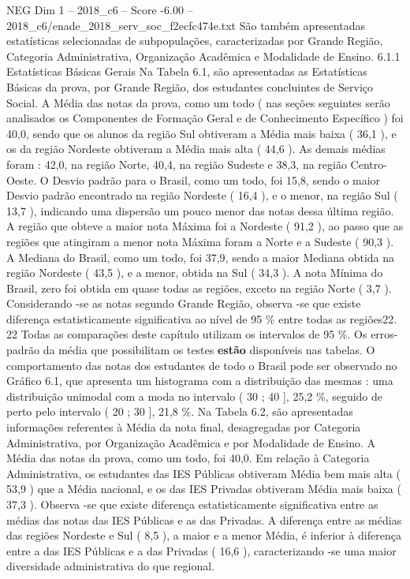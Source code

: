 \begin{textsample}{NEG Dim 1 – 2018\_c6 – Score -6.00 – 2018\_c6/enade\_2018\_serv\_soc\_f2ecfc474e.txt}
São também apresentadas estatísticas selecionadas de subpopulações, caracterizadas por Grande Região, Categoria Administrativa, Organização Acadêmica e Modalidade de Ensino. 6.1.1 Estatísticas Básicas Gerais Na Tabela 6.1, são apresentadas as Estatísticas Básicas da prova, por Grande Região, dos estudantes concluintes de Serviço Social.
A Média das notas da prova, como um todo ( nas seções seguintes serão analisados os Componentes de Formação Geral e de Conhecimento Específico ) foi 40,0, sendo que os alunos da região Sul obtiveram a Média mais baixa ( 36,1 ), e os da região Nordeste obtiveram a Média mais alta ( 44,6 ).
As demais médias foram : 42,0, na região Norte, 40,4, na região Sudeste e 38,3, na região Centro-Oeste.
O Desvio padrão para o Brasil, como um todo, foi 15,8, sendo o maior Desvio padrão encontrado na região Nordeste ( 16,4 ), e o menor, na região Sul ( 13,7 ), indicando uma dispersão um pouco menor das notas dessa última região.
A região que obteve a maior nota Máxima foi a Nordeste ( 91,2 ), ao passo que as regiões que atingiram a menor nota Máxima foram a Norte e a Sudeste ( 90,3 ).
A Mediana do Brasil, como um todo, foi 37,9, sendo a maior Mediana obtida na região Nordeste ( 43,5 ), e a menor, obtida na Sul ( 34,3 ).
A nota Mínima do Brasil, zero foi obtida em quase todas as regiões, exceto na região Norte ( 3,7 ).
Considerando -se as notas segundo Grande Região, observa -se que existe diferença estatisticamente significativa ao nível de 95 \% entre todas as regiões22. 22 Todas as comparações deste capítulo utilizam os intervalos de 95 \%.
Os erros-padrão da média que possibilitam os testes \textbf{estão} disponíveis nas tabelas.
O comportamento das notas dos estudantes de todo o Brasil pode ser observado no Gráfico 6.1, que apresenta um histograma com a distribuição das mesmas : uma distribuição unimodal com a moda no intervalo ( 30 ; 40 ], 25,2 \%, seguido de perto pelo intervalo ( 20 ; 30 ], 21,8 \%.
Na Tabela 6.2, são apresentadas informações referentes à Média da nota final, desagregadas por Categoria Administrativa, por Organização Acadêmica e por Modalidade de Ensino.
A Média das notas da prova, como um todo, foi 40,0.
Em relação à Categoria Administrativa, os estudantes das IES Públicas obtiveram Média bem mais alta ( 53,9 ) que a Média nacional, e os das IES Privadas obtiveram Média mais baixa ( 37,3 ).
Observa -se que existe diferença estatisticamente significativa entre as médias das notas das IES Públicas e as das Privadas.
A diferença entre as médias das regiões Nordeste e Sul ( 8,5 ), a maior e a menor Média, é inferior à diferença entre a das IES Públicas e a das Privadas ( 16,6 ), caracterizando -se uma maior diversidade administrativa do que regional.

\end{textsample}
